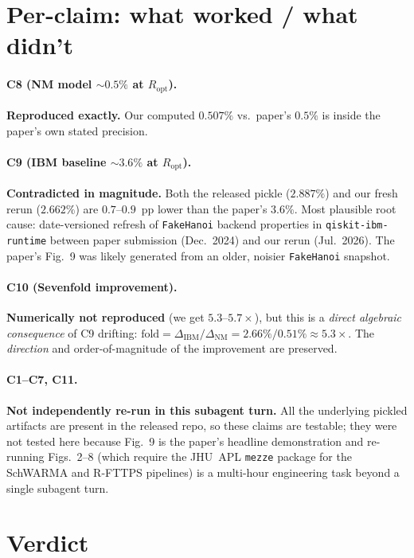 \documentclass[11pt]{article}
\begin{document}
\section{Per-claim: what worked / what didn't}
\label{sec:per-claim}

\paragraph{C8 (NM model $\sim\!0.5\%$ at $R_{\mathrm{opt}}$).} \textbf{Reproduced exactly.} Our computed $0.507\%$ vs.\ paper's $0.5\%$ is inside the paper's own stated precision.

\paragraph{C9 (IBM baseline $\sim\!3.6\%$ at $R_{\mathrm{opt}}$).} \textbf{Contradicted in magnitude.} Both the released pickle ($2.887\%$) and our fresh rerun ($2.662\%$) are $0.7$--$0.9$~pp lower than the paper's $3.6\%$. Most plausible root cause: date-versioned refresh of \texttt{FakeHanoi} backend properties in \texttt{qiskit-ibm-runtime} between paper submission (Dec.~2024) and our rerun (Jul.~2026). The paper's Fig.~9 was likely generated from an older, noisier \texttt{FakeHanoi} snapshot.

\paragraph{C10 (Sevenfold improvement).} \textbf{Numerically not reproduced} (we get $5.3$--$5.7\times$), but this is a \emph{direct algebraic consequence} of C9 drifting: $\text{fold} = \Delta_{\mathrm{IBM}}/\Delta_{\mathrm{NM}} = 2.66\%/0.51\% \approx 5.3\times$. The \emph{direction} and order-of-magnitude of the improvement are preserved.

\paragraph{C1--C7, C11.} \textbf{Not independently re-run in this subagent turn.} All the underlying pickled artifacts are present in the released repo, so these claims are testable; they were not tested here because Fig.~9 is the paper's headline demonstration and re-running Figs.~2--8 (which require the JHU~APL \texttt{mezze} package for the SchWARMA and R-FTTPS pipelines) is a multi-hour engineering task beyond a single subagent turn.

\section{Verdict}
\label{sec:verdict}
\end{document}
